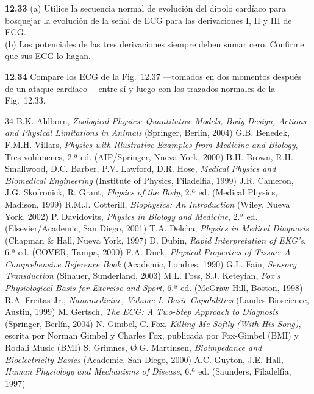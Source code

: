 \documentclass[12pt]{book}
\begin{document}
\noindent \textbf{12.33} (a) Utilice la secuencia normal de evolución del dipolo cardíaco para bosquejar la evolución de la señal de ECG para las derivaciones I, II y III de ECG. \\
(b) Los potenciales de las tres derivaciones siempre deben sumar cero. Confirme que sus ECG lo hagan.

\noindent \textbf{12.34} Compare los ECG de la Fig.~12.37 ---tomados en dos momentos después de un ataque cardíaco--- entre sí y luego con los trazados normales de la Fig.~12.33.

\begin{thebibliography}{34}
 B.K. Ahlborn, \textit{Zoological Physics: Quantitative Models, Body Design, Actions and Physical Limitations in Animals} (Springer, Berlín, 2004)
 G.B. Benedek, F.M.H. Villars, \textit{Physics with Illustrative Examples from Medicine and Biology}, Tres volúmenes, 2.ª ed. (AIP/Springer, Nueva York, 2000)
 B.H. Brown, R.H. Smallwood, D.C. Barber, P.V. Lawford, D.R. Hose, \textit{Medical Physics and Biomedical Engineering} (Institute of Physics, Filadelfia, 1999)
 J.R. Cameron, J.G. Skofronick, R. Grant, \textit{Physics of the Body}, 2.ª ed. (Medical Physics, Madison, 1999)
 R.M.J. Cotterill, \textit{Biophysics: An Introduction} (Wiley, Nueva York, 2002)
 P. Davidovits, \textit{Physics in Biology and Medicine}, 2.ª ed. (Elsevier/Academic, San Diego, 2001)
 T.A. Delcha, \textit{Physics in Medical Diagnosis} (Chapman \& Hall, Nueva York, 1997)
 D. Dubin, \textit{Rapid Interpretation of EKG's}, 6.ª ed. (COVER, Tampa, 2000)
 F.A. Duck, \textit{Physical Properties of Tissue: A Comprehensive Reference Book} (Academic, Londres, 1990)
 G.L. Fain, \textit{Sensory Transduction} (Sinauer, Sunderland, 2003)
 M.L. Foss, S.J. Keteyian, \textit{Fox's Physiological Basis for Exercise and Sport}, 6.ª ed. (McGraw-Hill, Boston, 1998)
 R.A. Freitas Jr., \textit{Nanomedicine, Volume I: Basic Capabilities} (Landes Bioscience, Austin, 1999)
 M. Gertsch, \textit{The ECG: A Two-Step Approach to Diagnosis} (Springer, Berlín, 2004)
 N. Gimbel, C. Fox, \textit{Killing Me Softly (With His Song)}, escrita por Norman Gimbel y Charles Fox, publicada por Fox-Gimbel (BMI) y Rodali Music (BMI)
 S. Grimnes, \O{}.G. Martinsen, \textit{Bioimpedance and Bioelectricity Basics} (Academic, San Diego, 2000)
 A.C. Guyton, J.E. Hall, \textit{Human Physiology and Mechanisms of Disease}, 6.ª ed. (Saunders, Filadelfia, 1997)

\end{thebibliography}
\end{document}
